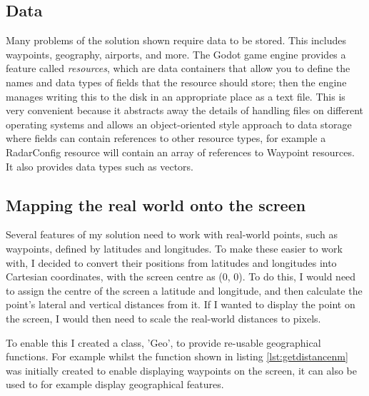 \documentclass{article}
\begin{document}
\subsection{Data}
Many problems of the solution shown require data to be stored.
This includes waypoints, geography, airports, and more.
The Godot game engine provides a feature called \textit{resources}, which are data containers that allow you to define the names and data types of fields that the resource should store; then the engine manages writing this to the disk in an appropriate place as a text file.
This is very convenient because it abstracts away the details of handling files on different operating systems and allows an object-oriented style approach to data storage where fields can contain references to other resource types, for example a RadarConfig resource will contain an array of references to Waypoint resources.
It also provides data types such as vectors.


\subsection{Mapping the real world onto the screen}
Several features of my solution need to work with real-world points, such as \glspl{waypoint}, defined by latitudes and longitudes.
To make these easier to work with, I decided to convert their positions from latitudes and longitudes into Cartesian coordinates, with the screen centre as (0, 0).
To do this, I would need to assign the centre of the screen a latitude and longitude, and then calculate the point's lateral and vertical distances from it.
If I wanted to display the point on the screen, I would then need to scale the real-world distances to pixels.

To enable this I created a class, 'Geo', to provide re-usable geographical functions.
For example whilst the function shown in listing \ref{lst:getdistancenm} was initially created to enable displaying waypoints on the screen, it can also be used to for example display geographical features.
\end{document}
